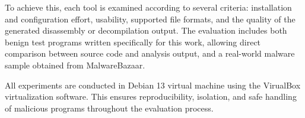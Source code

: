 To achieve this, each tool is examined according to several criteria: installation and configuration effort, usability, supported file formats, and the quality 
of the generated disassembly or decompilation output. The evaluation includes both benign test programs written specifically for this work, allowing direct comparison 
between source code and analysis output, and a real-world malware sample obtained from MalwareBazaar.

All experiments are conducted in Debian 13 virtual machine using the VirualBox virtualization software. 
This ensures reproducibility, isolation, and safe handling of malicious programs throughout the evaluation process.



%
%
%
%
%
%
%
%
%


